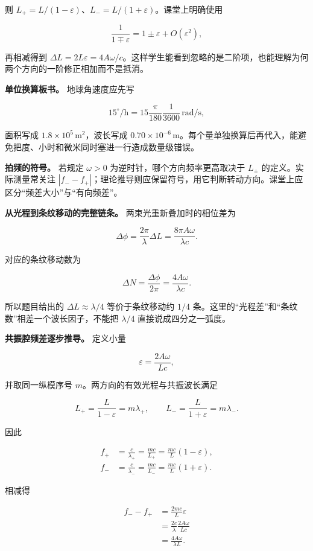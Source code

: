 \documentclass[12pt,a4paper,UTF8]{ctexart}
\begin{document}
则 \(L_+=L/(1-\varepsilon)\)、\(L_-=L/(1+\varepsilon)\)。课堂上明确使用

\[
\frac1{1\mp\varepsilon}=1\pm\varepsilon+O(\varepsilon^2),
\]

再相减得到
\(\Delta L=2L\varepsilon=4A\omega/c\)。这样学生能看到忽略的是二阶项，也能理解为何两个方向的一阶修正相加而不是抵消。

\textbf{单位换算板书。} 地球角速度应先写

\[
15^\circ/\mathrm h
=15\frac{\pi}{180}\frac1{3600}\,\mathrm{rad/s},
\]

面积写成 \(1.8\times10^5\,\mathrm{m^2}\)，波长写成
\(0.70\times10^{-6}\,\mathrm m\)。每个量单独换算后再代入，能避免把度、小时和微米同时塞进一行造成数量级错误。

\textbf{拍频的符号。} 若规定 \(\omega>0\)
为逆时针，哪个方向频率更高取决于 \(L_\pm\) 的定义。实际测量常关注
\(|f_--f_+|\)；理论推导则应保留符号，用它判断转动方向。课堂上应区分``频差大小''与``有向频差''。

\textbf{从光程到条纹移动的完整链条。} 两束光重新叠加时的相位差为

\[
\Delta\phi=\frac{2\pi}{\lambda}\Delta L
=\frac{8\pi A\omega}{\lambda c}.
\]

对应的条纹移动数为

\[
\Delta N=\frac{\Delta\phi}{2\pi}
=\frac{4A\omega}{\lambda c}.
\]

所以题目给出的 \(\Delta L\approx\lambda/4\) 等价于条纹移动约 \(1/4\)
条。这里的``光程差''和``条纹数''相差一个波长因子，不能把 \(\lambda/4\)
直接说成四分之一弧度。

\textbf{共振腔频差逐步推导。} 定义小量

\[
\varepsilon=\frac{2A\omega}{Lc},
\]

并取同一纵模序号 \(m\)。两方向的有效光程与共振波长满足

\[
L_+=\frac{L}{1-\varepsilon}=m\lambda_+,
\qquad
L_-=\frac{L}{1+\varepsilon}=m\lambda_-.
\]

因此

\[
\begin{aligned}
f_+&=\frac{c}{\lambda_+}
=\frac{mc}{L_+}
=\frac{mc}{L}(1-\varepsilon),\\
f_-&=\frac{c}{\lambda_-}
=\frac{mc}{L_-}
=\frac{mc}{L}(1+\varepsilon).
\end{aligned}
\]

相减得

\[
\begin{aligned}
f_--f_+
&=\frac{2mc}{L}\varepsilon\\
&=\frac{2c}{\lambda}\frac{2A\omega}{Lc}\\
&=\boxed{\frac{4A\omega}{\lambda L}}.
\end{aligned}
\]
\end{document}
